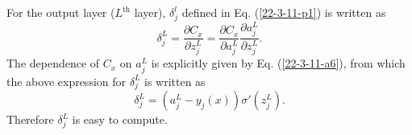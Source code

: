 \documentclass{article}
\newcommand{\tmop}[1]{\ensuremath{\operatorname{#1}}}
\begin{document}
\


\

\

\

For the output layer ($L^{\tmop{th}}$ layer), $\delta^l_j$ defined in Eq.
(\ref{22-3-11-p1}) is written as
\begin{equation}
  \delta^L_j = \frac{\partial C_x}{\partial z_j^L} = \frac{\partial
  C_x}{\partial a^L_j}  \frac{\partial a^L_j}{\partial z_j^L} .
\end{equation}
The dependence of $C_x$ on $a_j^L$ is explicitly given by Eq.
(\ref{22-3-11-a6}), from which the above expression for $\delta_j^L$ is
written as
\begin{equation}
  \delta^L_j = (a^L_j - y_j (x)) \sigma' (z_j^L) .
\end{equation}
Therefore $\delta^L_j$ is easy to compute.
\end{document}
